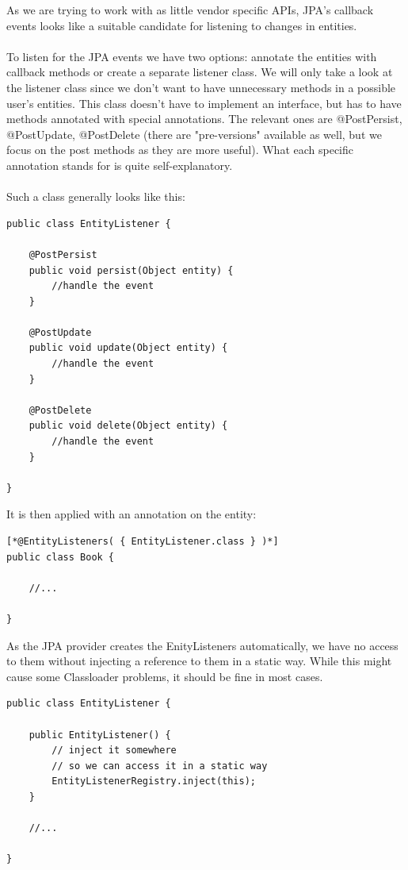 As we are trying to work with as little vendor specific APIs, JPA's callback events looks like a suitable candidate for listening to changes in entities.
\\\\
To listen for the JPA events we have two options: annotate the entities with callback methods or create a separate listener class. We will only take a look at the listener class since we don't want to have unnecessary methods in a possible user's entities. This class doesn't have to implement an interface, but has to have methods annotated with special annotations. The relevant ones are @PostPersist, @PostUpdate, @PostDelete (there are "pre-versions" available as well, but we focus on the post methods as they are more useful). What each specific annotation stands for is quite self-explanatory.
\\\\
Such a class generally looks like this:
\\
\lstset{language=java}
\begin{lstlisting}[frame=htrbl, caption={Example JPA entity listener}, label={lst:jpa_entity_listener.java}]
public class EntityListener {

	@PostPersist
	public void persist(Object entity) {
		//handle the event
	}
	
	@PostUpdate
	public void update(Object entity) {
		//handle the event
	}
	
	@PostDelete
	public void delete(Object entity) {
		//handle the event
	}

}
\end{lstlisting}
\noindent
It is then applied with an annotation on the entity:
\\
\lstset{language=java}
\begin{lstlisting}[frame=htrbl, caption={Using a JPA entity listener}, label={lst:using_jpa_entitylisteners.java}]
[*@EntityListeners( { EntityListener.class } )*]
public class Book {

	//...

}
\end{lstlisting}
\noindent
As the JPA provider creates the EnityListeners automatically, we have no access to them without injecting a reference to them in a static way. While this might cause some Classloader problems, it should be fine in most cases.
\\
\lstset{language=java}
\begin{lstlisting}[frame=htrbl, caption={Injecting the EntityListener}, label={lst:jpa_entity_listener.java}]
public class EntityListener {

	public EntityListener() {
		// inject it somewhere
		// so we can access it in a static way
		EntityListenerRegistry.inject(this);
	}

	//...

}
\end{lstlisting}

